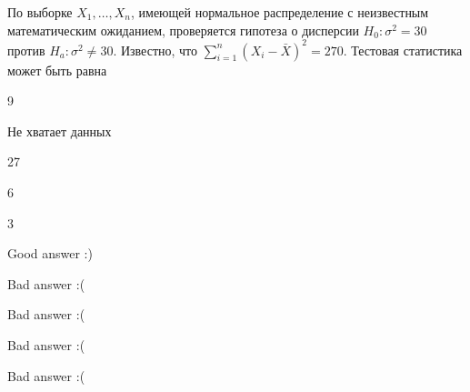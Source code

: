 
\begin{question}
По выборке \(X_1,\ldots,X_{n}\), имеющей нормальное распределение с
неизвестным математическим ожиданием, проверяется гипотеза о дисперсии
\(H_0: \sigma^2 = 30\) против \(H_a: \sigma^2 \ne 30\). Известно, что
\(\sum_{i=1}^{n} (X_i - \bar{X})^2 = 270\). Тестовая статистика может
быть равна
\begin{answerlist}
  \item 9
  \item Не хватает данных
  \item 27
  \item 6
  \item 3
\end{answerlist}
\end{question}

\begin{solution}
\begin{answerlist}
  \item Good answer :)
  \item Bad answer :(
  \item Bad answer :(
  \item Bad answer :(
  \item Bad answer :(
\end{answerlist}
\end{solution}

